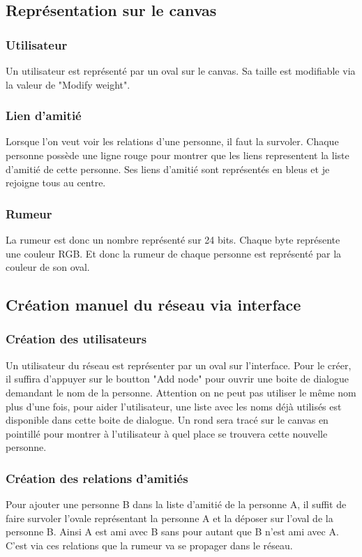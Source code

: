 \documentclass[a4paper,11pt]{article}
\begin{document}
{\subsection {Représentation sur le canvas}
\subsubsection {Utilisateur}
{Un utilisateur est représenté par un oval sur le canvas. Sa taille est modifiable via la valeur de "Modify weight".}
\subsubsection {Lien d'amitié}
{Lorsque l'on veut voir les relations d'une personne, il faut la survoler. Chaque personne possède une ligne rouge pour montrer que 
les liens representent la liste d'amitié de cette personne. Ses liens d'amitié sont représentés en bleus et je rejoigne tous au centre.}
\subsubsection {Rumeur}
{La rumeur est donc un nombre représenté sur 24 bits. Chaque byte représente une couleur RGB. Et donc la rumeur de chaque personne est 
représenté par la couleur de son oval.}
\subsection {Création manuel du réseau via interface}
\subsubsection {Création des utilisateurs}
{Un utilisateur du réseau est représenter par un oval sur l'interface. Pour le créer, il suffira d'appuyer sur le boutton "Add node" 
pour ouvrir une boite de dialogue demandant le nom de la personne. Attention on ne peut pas utiliser le même nom plus d'une fois, pour aider l'utilisateur,
une liste avec les noms déjà utilisés est disponible dans cette boite de dialogue.
Un rond sera tracé sur le canvas en pointillé pour montrer à l'utilisateur à quel place se trouvera cette nouvelle personne.}
\subsubsection {Création des relations d'amitiés}
{Pour ajouter une personne B dans la liste d'amitié de la personne A, il suffit de faire survoler l'ovale représentant la personne A et la déposer 
sur l'oval de la personne B. Ainsi A est ami avec B sans pour autant que B n'est ami avec A. C'est via ces relations que la rumeur 
va se propager dans le réseau.}
}
\end{document}
